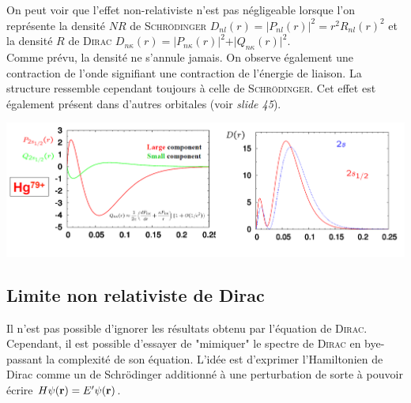 On peut voir que l'effet non-relativiste n'est pas négligeable lorsque l'on représente la densité
$NR$ de \textsc{Schrödinger} $D_{n l}(r) = \vert P_{nl}(r) \vert^2 = r^2 R_{nl}(r) ^2$ et la 
densité $R$ de \textsc{Dirac} $D_{n \kappa}(r) = \vert P_{n \kappa}(r) \vert^2
+  \vert Q_{n \kappa}(r) \vert^2$.\\

Comme prévu, la densité ne s'annule jamais. On observe également une contraction de l'onde signifiant
une contraction de l'énergie de liaison. La structure ressemble cependant toujours à celle de 
\textsc{Schrödinger}. Cet effet est également présent dans d'autres orbitales (voir \textit{slide 
45}).


\begin{center}
	\includegraphics[scale=0.4]{ch1/image9}
\end{center}


\subsection{Limite non relativiste de Dirac}
Il n'est pas possible d'ignorer les résultats obtenu par l'équation de \textsc{Dirac}. Cependant, 
il est possible d'essayer de "mimiquer" le spectre de \textsc{Dirac} en bye-passant la complexité
de son équation. L'idée est d'exprimer l'Hamiltonien de Dirac comme un de Schrödinger additionné à
une perturbation de sorte à pouvoir écrire $H \psi ({\bf r}) = E' \psi ({\bf r})$. \\

